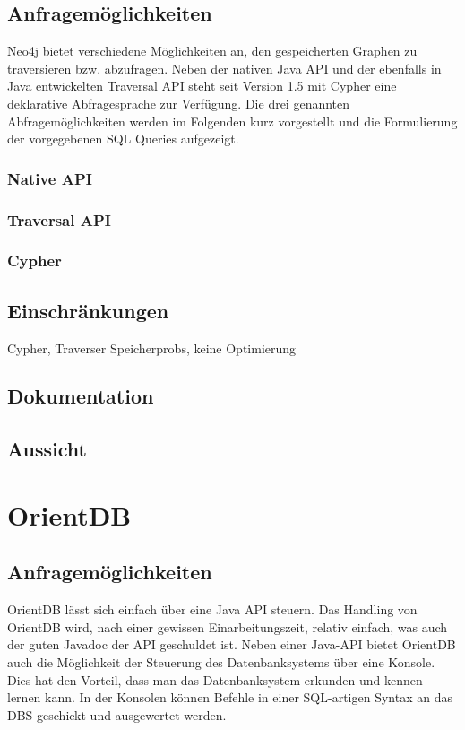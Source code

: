 \documentclass[11pt, a4paper, oneside, twocolumn]{article} %
\begin{document}
\subsection{Anfragemöglichkeiten}

Neo4j bietet verschiedene Möglichkeiten an, den gespeicherten Graphen zu traversieren bzw. abzufragen. Neben der nativen Java API und der ebenfalls in Java entwickelten Traversal API steht seit Version 1.5 mit Cypher eine deklarative Abfragesprache zur Verfügung. Die drei genannten Abfragemöglichkeiten werden im Folgenden kurz vorgestellt und die Formulierung der vorgegebenen SQL Queries aufgezeigt.

\subsubsection{Native API}

\subsubsection{Traversal API}

\subsubsection{Cypher}

\subsection{Einschränkungen}

Cypher, Traverser Speicherprobs, keine Optimierung

\subsection{Dokumentation}

\subsection{Aussicht}

\section{OrientDB}

\subsection{Anfragemöglichkeiten}

OrientDB lässt sich einfach über eine Java API steuern. Das Handling von OrientDB wird, nach einer gewissen Einarbeitungszeit, relativ einfach, was auch der guten Javadoc der API geschuldet ist. Neben einer Java-API bietet OrientDB auch die Möglichkeit der Steuerung des Datenbanksystems über eine Konsole. Dies hat den Vorteil, dass man das Datenbanksystem erkunden und kennen lernen kann. In der Konsolen können Befehle in einer SQL-artigen Syntax an das DBS geschickt und ausgewertet werden.
\end{document}
